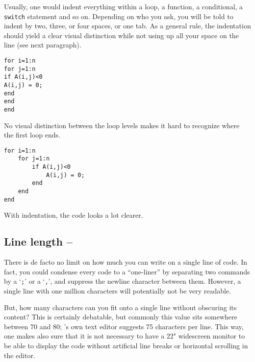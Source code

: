 Usually, one would indent everything within a loop, a function, a conditional,
a \lstinline!switch! statement and so on. Depending on who you ask, you will be
told to indent by two, three, or four spaces, or one tab. As a general rule,
the indentation should yield a clear visual distinction while not using up all
your space on the line (see next paragraph).

\hfill
\begin{minipage}[t]{.45\textwidth}
\begin{lstlisting}[framerule=2pt,rulecolor=\color{badred}]
for i=1:n
for j=1:n
if A(i,j)<0
A(i,j) = 0;
end
end
end
\end{lstlisting}
No visual distinction between the loop levels makes it hard to recognize where the first loop ends.\footnotemark
\end{minipage}
\hfill
\begin{minipage}[t]{.45\textwidth}
\begin{lstlisting}[framerule=2pt,rulecolor=\color{goodgreen}]
for i=1:n
    for j=1:n
        if A(i,j)<0
            A(i,j) = 0;
        end
    end
end
\end{lstlisting}
With indentation, the code looks a lot clearer.\footnotemark[\value{footnote}]
\end{minipage}
\hfill






\subsection{Line length -- \cleansymbol}
There is de facto no limit on how much you can write on a single line of
\matlab{} code. In fact, you could condense every \matlab{} code to a
``one-liner'' by separating two commands by a `\lstinline!;!' or a
`\lstinline!,!', and suppress the newline character between them. However, a
single line with one million characters will potentially not be very readable.

But, how many characters can you fit onto a single line without obscuring its
content? This is certainly debatable, but commonly this value sits somewhere
between 70 and 80; \matlab{}'s own text editor suggests 75 characters per
line. This way, one makes also sure that it is not necessary to have a 22"
widescreen monitor to be able to display the code without artificial line
breaks or horizontal scrolling in the editor.

